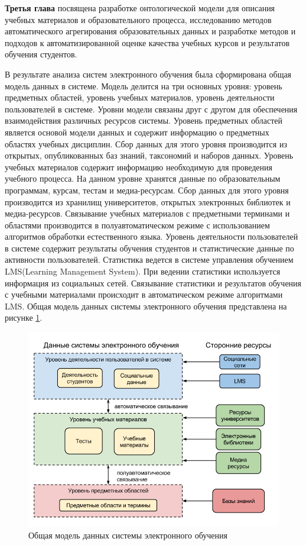 \textbf{Третья глава} посвящена разработке онтологической модели для описания учебных материалов и образовательного процесса, исследованию методов автоматического агрегирования образовательных данных и разработке методов и подходов к автоматизированной оценке качества учебных курсов и результатов обучения студентов.  

В результате анализа систем электронного обучения была сформирована общая модель данных в системе. Модель делится на три основных уровня: уровень предметных областей, уровень учебных материалов, уровень деятельности пользователей в системе. Уровни модели связаны друг с другом для обеспечения взаимодействия различных ресурсов системы. Уровень предметных областей является основой модели данных и содержит информацию о предметных областях учебных дисциплин. Сбор данных для этого уровня производится из открытых, опубликованных баз знаний, таксономий и наборов данных. Уровень учебных материалов содержит информацию необходимую для проведения учебного процесса. На данном уровне хранятся данные по образовательным программам, курсам, тестам и медиа-ресурсам. Сбор данных для этого уровня производится из хранилищ университетов, открытых электронных библиотек и медиа-ресурсов. Связывание учебных материалов с предметными терминами и областями производится в полуавтоматическом режиме с использованием алгоритмов обработки естественного языка. Уровень деятельности пользователей в системе содержит результаты обучения студентов и  статистические данные по активности пользователей. Статистика ведется в системе управления обучением LMS(Learning Management System). При ведении статистики используется информация из социальных сетей. Связывание статистики и результатов обучения с учебными материалами происходит в автоматическом режиме алгоритмами LMS. Общая модель данных системы электронного обучения представлена на рисунке \ref{fig:OverallModel}. 

\begin{figure}[ht] 
  \center
  \includegraphics[scale=0.5]{OverallModel}
  \caption{Общая модель данных системы электронного обучения} 
  \label{fig:OverallModel}
\end{figure}

